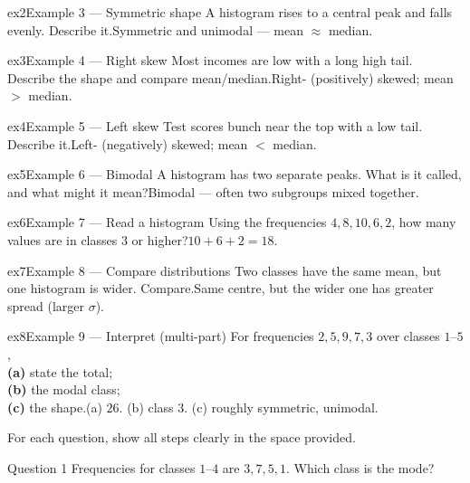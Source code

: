 \documentclass[11pt]{article}
\begin{document}
\begin{example}{ex2}{Example 3 --- Symmetric shape}
A histogram rises to a central peak and falls evenly. Describe it.\soln Symmetric and unimodal --- mean $\approx$ median.
\end{example}

\begin{example}{ex3}{Example 4 --- Right skew}
Most incomes are low with a long high tail. Describe the shape and compare mean/median.\soln Right- (positively) skewed; mean $>$ median.
\end{example}

\begin{example}{ex4}{Example 5 --- Left skew}
Test scores bunch near the top with a low tail. Describe it.\soln Left- (negatively) skewed; mean $<$ median.
\end{example}

\begin{example}{ex5}{Example 6 --- Bimodal}
A histogram has two separate peaks. What is it called, and what might it mean?\soln Bimodal --- often two subgroups mixed together.
\end{example}

\begin{example}{ex6}{Example 7 --- Read a histogram}
Using the frequencies $4,8,10,6,2$, how many values are in classes $3$ or higher?\soln $10+6+2=18$.
\end{example}

\begin{example}{ex7}{Example 8 --- Compare distributions}
Two classes have the same mean, but one histogram is wider. Compare.\soln Same centre, but the wider one has greater spread (larger $\sigma$).
\end{example}

\begin{example}{ex8}{Example 9 --- Interpret (multi-part)}
For frequencies $2,5,9,7,3$ over classes $1$--$5$, \\ \textbf{(a)} state the total; \\ \textbf{(b)} the modal class; \\ \textbf{(c)} the shape.\soln (a) $26$. (b) class $3$. (c) roughly symmetric, unimodal.
\end{example}

\clearpage
{}
For each question, show all steps clearly in the space provided.

\begin{qbox}{Question 1}
Frequencies for classes $1$--$4$ are $3,7,5,1$. Which class is the mode?\workspace{2.4cm}
\end{qbox}
\end{document}
